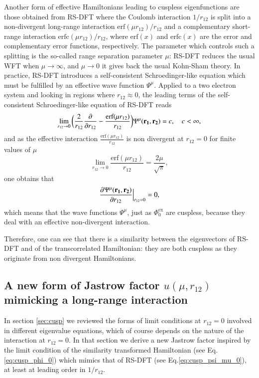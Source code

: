 \documentclass[aip,jcp,reprint,noshowkeys,superscriptaddress]{revtex4-1}
\newcommand{\deriv}[3]{\frac{\partial^{#3} #1}{\partial {#2}^{#3}}}
\newcommand{\bd}[1]{{\bf {#1}}}
\newcommand{\phiex}[0]{\Phi^{\text{ex}}_0}
\begin{document}
Another form of effective Hamiltonians leading to cuspless eigenfunctions are those obtained from RS-DFT 
where the Coulomb interaction $1/r_{12}$ is split into a non-divergent long-range interaction $\text{erf}(\mu r_{12})/r_{12}$ and a complementary short-range interaction $\text{erfc}(\mu r_{12})/r_{12}$, where $\text{erf}(x)$ and $\text{erfc}(x)$ are the error and complementary error functions, respectively. 
The parameter which controls such a splitting is the so-called range separation parameter $\mu$:  RS-DFT reduces the usual WFT when $\mu \rightarrow \infty$, and $\mu \rightarrow 0$ it gives back the usual Kohn-Sham theory.  
In practice, RS-DFT introduces a self-consistent Schroedinger-like equation which must be fulfilled by an effective wave function  $\Psi^\mu$.
Applied to a two electron system and looking in regions where $r_{12}\approx 0$, the leading terms of the self-consistent Schroedinger-like equation of RS-DFT reads 
\begin{equation}
 \label{eq:cusp_psi_mu_0}
 \lim_{r_{12}\rightarrow 0}\bigg( \frac{2}{r_{12}} \deriv{}{r_{12}}{} -\frac{\text{erf}(\mu r_{12})}{r_{12}}\bigg) \Psi^\mu(\bd{r_1},\bd{r_2})  = c,\quad c<\infty,  
\end{equation}
and as the effective interaction $\frac{\text{erf}(\mu r_{12})}{r_{12}}$ is non divergent at $r_{12}=0$ for finite values of $\mu$
\begin{equation}
 \lim_{r_{12} \rightarrow 0} \frac{\text{erf}(\mu r_{12})}{r_{12}} = \frac{2 \mu}{\sqrt{\pi}} , 
\end{equation}
one obtains that 
\begin{equation}
 \label{eq:cusp_psi_mu_1}
 \deriv{\Psi^\mu(\bd{r_1},\bd{r_2})}{r_{12}}{}\Bigr|_{r_{12}=0} = 0, 
\end{equation}
which means that the wave functions $\Psi^\mu$, just as $\phiex$ are cuspless, because they deal with an effective non-divergent interaction. 

Therefore, one can see that there is a similarity between the eigenvectors of RS-DFT and of the transcorrelated Hamiltonian: they are both cuspless as they originate from non divergent Hamiltonians. 

\subsection{A new form of Jastrow factor $u(\mu,r_{12})$ mimicking a long-range interaction}
In section \ref{sec:cusp} we reviewed the forms of limit conditions at $r_{12}=0$ involved in different eigenvalue equations, which of course depends on the nature of the interaction at $r_{12}=0$. 
In that section we derive a new Jastrow factor inspired by the limit condition of the similarity transformed Hamiltonian (see Eq.\eqref{eq:cusp_phi_0}) which mimics that of RS-DFT (see Eq.\eqref{eq:cusp_psi_mu_0}), at least at leading order in $1/r_{12}$. 
\end{document}
